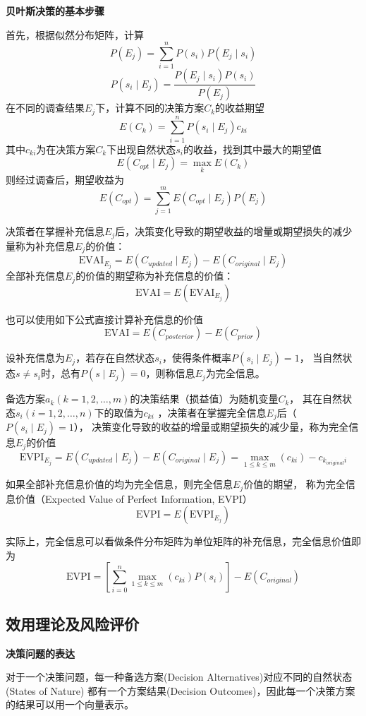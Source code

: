 \documentclass[a4paper,12pt]{article}
\begin{document}
\noindent
\textbf{贝叶斯决策的基本步骤}

首先，根据似然分布矩阵，计算
$$
P\left(E_j\right)=\sum_{i=1}^nP\left(s_i\right)P\left(E_j\mid s_i\right)
$$
$$
P\left(s_i\mid E_j\right)=\frac{P\left(E_j\mid s_i\right)P\left(s_i\right)}{P\left(E_j\right)}
$$
在不同的调查结果$E_j$下，计算不同的决策方案$C_k$的收益期望
$$
E\left(C_k\right)=\sum_{i=1}^nP\left(s_i\mid E_j\right)c_{ki}
$$
其中$c_{ki}$为在决策方案$C_k$下出现自然状态$s_i$的收益，找到其中最大的期望值
$$
E\left(C_{opt}\mid E_j\right)=\max_kE\left(C_k\right)
$$
则经过调查后，期望收益为
$$
E\left(C_{opt}\right)=\sum_{j=1}^mE\left(C_{opt}\mid E_j\right)P\left(E_j\right)
$$

决策者在掌握补充信息$E_j$后，决策变化导致的期望收益的增量或期望损失的减少量称为补充信息$E_j$的价值：
$$
\text{EVAI}_{E_j}=E\left(C_{updated}\mid E_j\right)-E\left(C_{original}\mid E_j\right)
$$
全部补充信息$E_j$的价值的期望称为补充信息的价值：
$$
\text{EVAI}=E(\text{EVAI}_{E_j})
$$

也可以使用如下公式直接计算补充信息的价值
$$
\text{EVAI}=E\left(C_{posterior}\right)-E\left(C_{prior}\right)
$$

设补充信息为$E_j$，若存在自然状态$s_i$，使得条件概率$P\left(s_i\mid E_j\right)=1$，
当自然状态$s\ne s_i$时，总有$P\left(s\mid E_j\right)=0$，则称信息$E_j$为完全信息。

备选方案$a_k(k=1,2,\dots,m)$的决策结果（损益值）为随机变量$C_k$，
其在自然状态$s_i(i=1,2,\dots,n)$下的取值为$c_{ki}$ ，决策者在掌握完全信息$E_j$后（$P\left(s_i\mid E_j\right)=1$），
决策变化导致的收益的增量或期望损失的减少量，称为完全信息$E_j$的价值
$$
\text{EVPI}_{E_j}=E\left(C_{updated}\mid E_j\right)-E\left(C_{original}\mid E_j\right)=\max_{1\le k\le m}(c_{ki})-c_{k_{original}i}
$$

如果全部补充信息价值的均为完全信息，则完全信息$E_j$价值的期望，
称为完全信息价值（Expected Value of Perfect Information, EVPI）
$$
\text{EVPI}=E\left(\text{EVPI}_{E_j}\right)
$$

实际上，完全信息可以看做条件分布矩阵为单位矩阵的补充信息，完全信息价值即为
$$
\text{EVPI}=\left[\sum_{i=0}^n\max_{1\le k \le m}(c_{ki})P(s_i)\right]-E\left(C_{original}\right)
$$

\subsection{效用理论及风险评价}

\noindent
\textbf{决策问题的表达}

对于一个决策问题，每一种备选方案(Decision Alternatives)对应不同的自然状态(States of Nature)
都有一个方案结果(Decision Outcomes)，因此每一个决策方案的结果可以用一个向量表示。
\end{document}

